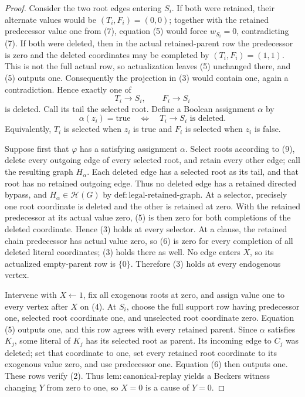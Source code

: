 \documentclass{article}
\begin{document}
\begin{proof}
Consider the two root edges entering \(S_i\).  If both were retained, their alternate values would be \((T_i,F_i)=(0,0)\); together with the retained predecessor value one from (7), equation (5) would force \(w_{S_i}=0\), contradicting (7).  If both were deleted, then in the actual retained-parent row the predecessor is zero and the deleted coordinates may be completed by \((T_i,F_i)=(1,1)\).  This is not the full actual row, so actualization leaves (5) unchanged there, and (5) outputs one.  Consequently the projection in (3) would contain one, again a contradiction.  Hence exactly one of
\[
 T_i\to S_i,\qquad F_i\to S_i                                                       \tag{8}
\]
is deleted.  Call its tail the selected root.  Define a Boolean assignment \(\alpha\) by
\[
 \alpha(z_i)=\mathrm{true}\quad\Longleftrightarrow\quad T_i\to S_i\text{ is deleted}. \tag{9}
\]
Equivalently, \(T_i\) is selected when \(z_i\) is true and \(F_i\) is selected when \(z_i\) is false.

Suppose first that \(\varphi\) has a satisfying assignment \(\alpha\).  Select roots according to (9), delete every outgoing edge of every selected root, and retain every other edge; call the resulting graph \(H_\alpha\).  Each deleted edge has a selected root as its tail, and that root has no retained outgoing edge.  Thus no deleted edge has a retained directed bypass, and \(H_\alpha\in\mathcal H(G)\) by \(\mathrm{def:legal\mbox{-}retained\mbox{-}graph}\).  At a selector, precisely one root coordinate is deleted and the other is retained at zero.  With the retained predecessor at its actual value zero, (5) is then zero for both completions of the deleted coordinate.  Hence (3) holds at every selector.  At a clause, the retained chain predecessor has actual value zero, so (6) is zero for every completion of all deleted literal coordinates; (3) holds there as well.  No edge enters \(X\), so its actualized empty-parent row is \(\{0\}\).  Therefore (3) holds at every endogenous vertex.

Intervene with \(X\leftarrow1\), fix all exogenous roots at zero, and assign value one to every vertex after \(X\) on (4).  At \(S_i\), choose the full support row having predecessor one, selected root coordinate one, and unselected root coordinate zero.  Equation (5) outputs one, and this row agrees with every retained parent.  Since \(\alpha\) satisfies \(K_j\), some literal of \(K_j\) has its selected root as parent.  Its incoming edge to \(C_j\) was deleted; set that coordinate to one, set every retained root coordinate to its exogenous value zero, and use predecessor one.  Equation (6) then outputs one.  These rows verify (2).  Thus \(\mathrm{lem:canonical\mbox{-}replay}\) yields a Beckers witness changing \(Y\) from zero to one, so \(X=0\) is a cause of \(Y=0\).


\end{proof}
\end{document}
